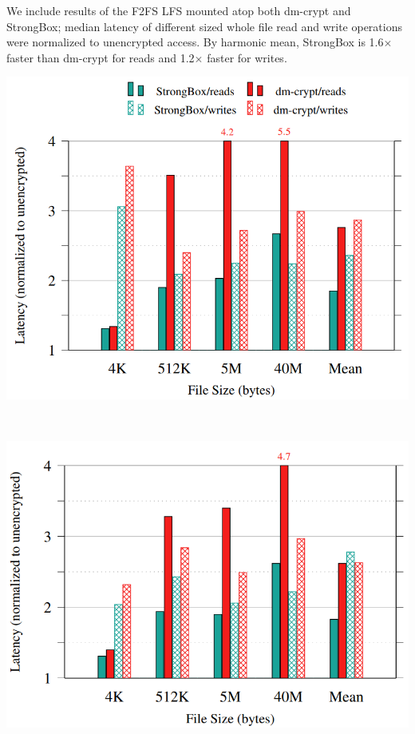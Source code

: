 \documentclass[a0,portrait]{a0poster}
\newcommand{\PAD}{\vskip 0.75cm}
\begin{document}
\begin{multicols}{2}
We include results of the F2FS LFS mounted atop both dm-crypt and StrongBox;
median latency of different sized whole file read and write operations were
normalized to unencrypted access. By harmonic mean, StrongBox is 1.6$\times$
faster than dm-crypt for reads and 1.2$\times$ faster for writes.

\begin{minipage}{\columnwidth}
\PAD 
\centering
\includegraphics[scale=0.85]{first_bars}
\label{fig:microbench-f2fs-sequential}
\PAD 
\end{minipage}\\[1ex]
\begin{minipage}{\columnwidth}
\PAD 
\centering
\includegraphics[scale=0.85]{second_bars}
\label{fig:microbench-f2fs}
\PAD 
\end{minipage}


\end{multicols}
\end{document}
